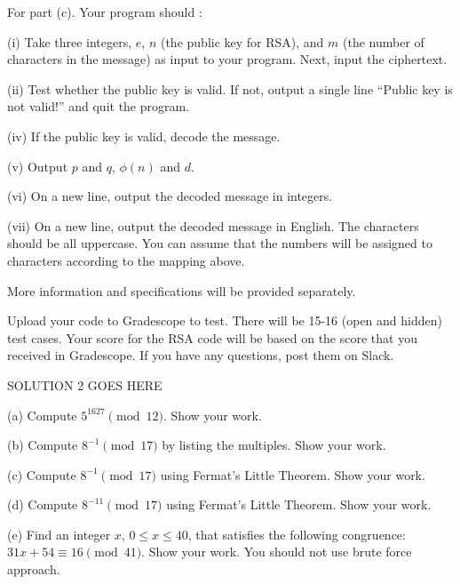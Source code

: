 \documentclass[11pt]{article}
\begin{document}
\begin{problem}
\begin{description}
\end{description}

\vspace{0.2in}
\noindent For part (c). Your program should :
\begin{description}

	\item (i) Take three integers, $e$, $n$ (the public key for RSA), and $m$ (the number of characters in the message) as input to your program. Next, input the ciphertext.
	\item (ii) Test whether the public key is valid. If not, output a single line ``Public key is not valid!'' and quit the program.
	\item (iv) If the public key is valid, decode the message.
	\item (v) Output $p$ and $q$, $\phi(n)$ and $d$.
	\item (vi) On a new line, output the decoded message in integers.
	\item (vii) On a new line, output the decoded message in English. The characters should be all uppercase. You can assume that the numbers will be assigned to characters according to the mapping above.
 
\end{description}

\noindent More information and specifications will be provided separately.

\vspace{0.2in}
\noindent Upload your code to Gradescope to test. There will be 15-16 (open and hidden) test cases.  Your score for the RSA code will be based on the score that you received in Gradescope. If you have any questions, post them on Slack.


\end{problem}
\vspace{0.2in}




\begin{solution}
	SOLUTION 2 GOES HERE
\end{solution}

\pagebreak
\begin{problem} %
 	

    \medskip\noindent
    (a) Compute $5^{1627}\pmod{12}$. Show your work.
    
    \medskip\noindent
    (b) Compute $8^{-1}\pmod{17}$ by listing the multiples. Show your work.
    
    \medskip\noindent
    (c) Compute $8^{-1}\pmod{17}$ using Fermat's Little Theorem. Show your work.
    
    \medskip\noindent
    (d) Compute $8^{-11}\pmod{17}$ using Fermat's Little Theorem. Show your work.
    
    \medskip\noindent
    (e) Find an integer $x$, $0\le x \le 40$, that satisfies the following congruence:
    $31x + 54 \equiv 16 \pmod{41}$. Show your work. You should not use brute force approach.
    

\end{problem}
\end{document}
